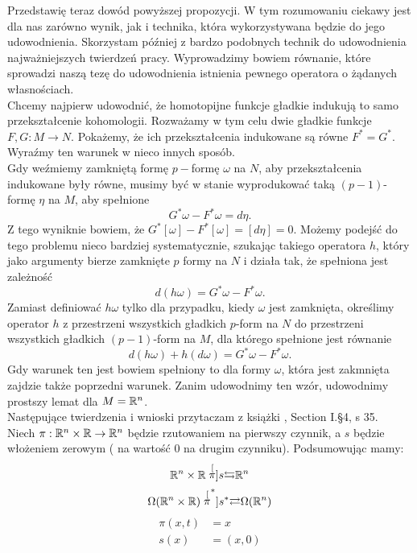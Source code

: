 \documentclass[licencjacka]{pracamgr}
\theoremstyle{definition}
\theoremstyle{definition}
\theoremstyle{plain}
\theoremstyle{plain}
\theoremstyle{plain}
\theoremstyle{plain}
\def\R{\ensuremath\mathbb{R}}
\begin{document}
Przedstawię teraz dowód powyższej propozycji.  W tym rozumowaniu ciekawy jest
dla nas zarówno wynik, jak i technika, która wykorzystywana będzie do jego
udowodnienia.  Skorzystam później z bardzo podobnych technik do udowodnienia
najważniejszych twierdzeń pracy.  Wyprowadzimy bowiem równanie, które sprowadzi
naszą tezę do udowodnienia istnienia pewnego operatora o żądanych własnościach.  \\

Chcemy najpierw udowodnić, że homotopijne funkcje gładkie indukują to samo
przekształcenie kohomologii.  Rozważamy w tym celu dwie gładkie funkcje $F, G:
M \rightarrow N$.  Pokażemy, że ich przekształcenia indukowane są równe
$F^\ast = G^\ast$. Wyraźmy ten warunek w nieco innych sposób. \\

Gdy weźmiemy zamkniętą formę $p-$formę $\omega$ na $N$, aby
przekształcenia indukowane były równe, musimy być w stanie
wyprodukować taką $(p-1)$-formę $\eta$ na $M$, aby spełnione
\[
    G^\ast \omega - F^\ast \omega = d\eta.
\]
Z tego wyniknie bowiem, że
$ G^\ast [\omega] - F^\ast [\omega] =
[d\eta] = 0$. 
Możemy podejść do tego problemu nieco bardziej systematycznie, 
szukając takiego operatora
$h$, który jako argumenty bierze zamknięte $p$ formy na $N$
i działa tak, że spełniona jest zależność
\[
    d(h\omega) = G^\ast \omega - F^\ast \omega.
\] 
Zamiast definiować $h \omega$ tylko dla przypadku, kiedy $\omega$
jest zamknięta, określimy operator
$h$ z przestrzeni wszystkich gładkich $p$-form na $N$
do przestrzeni wszystkich gładkich $(p-1)$-form na $M$,
dla którego spełnione jest równanie
\begin{equation}\label{homotopy-formula}
    d(h\omega) + h(d\omega) = G^\ast \omega - F^\ast \omega.
\end{equation}
Gdy warunek ten jest bowiem spełniony to dla formy $\omega$, która
jest zakmnięta zajdzie także poprzedni warunek.  Zanim udowodnimy
ten wzór, udowodnimy prostszy lemat dla $M = \R^n$. \\

Następujące twierdzenia i wnioski przytaczam z książki \cite{bott}, Section
I.\S4, s 35. \\

Niech $\pi: \R^n \times \R \rightarrow \R^n$  będzie rzutowaniem
na pierwszy czynnik, a $s$  będzie włożeniem zerowym (
na wartość $0$ na drugim czynniku). Podsumowując mamy:
\[
 \R^n \times \R
 \stackrel[\pi]{s}{\leftrightarrows} 
 \R^n
\]
\[
 \Omega (\R^n \times \R)
 \stackrel[\pi^\ast]{s^\ast}{\rightleftarrows} 
 \Omega(\R^n)
\]
\begin{align*}
    \pi(x, t) &= x \\
         s(x) &= (x, 0)
\end{align*}
\end{document}
